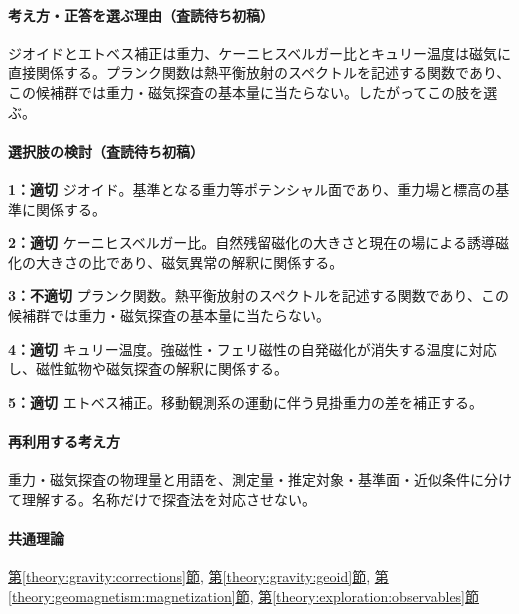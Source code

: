 \paragraph{考え方・正答を選ぶ理由（査読待ち初稿）} ジオイドとエトベス補正は重力、ケーニヒスベルガー比とキュリー温度は磁気に直接関係する。プランク関数は熱平衡放射のスペクトルを記述する関数であり、この候補群では重力・磁気探査の基本量に当たらない。したがってこの肢を選ぶ。

\paragraph{選択肢の検討（査読待ち初稿）}\mbox{}\par

\noindent\textbf{1：適切} ジオイド。基準となる重力等ポテンシャル面であり、重力場と標高の基準に関係する。\par

\noindent\textbf{2：適切} ケーニヒスベルガー比。自然残留磁化の大きさと現在の場による誘導磁化の大きさの比であり、磁気異常の解釈に関係する。\par

\noindent\textbf{3：不適切} プランク関数。熱平衡放射のスペクトルを記述する関数であり、この候補群では重力・磁気探査の基本量に当たらない。\par

\noindent\textbf{4：適切} キュリー温度。強磁性・フェリ磁性の自発磁化が消失する温度に対応し、磁性鉱物や磁気探査の解釈に関係する。\par

\noindent\textbf{5：適切} エトベス補正。移動観測系の運動に伴う見掛重力の差を補正する。\par

\paragraph{再利用する考え方} 重力・磁気探査の物理量と用語を、測定量・推定対象・基準面・近似条件に分けて理解する。名称だけで探査法を対応させない。

\paragraph{共通理論} \hyperref[theory:gravity:corrections]{第\ref*{theory:gravity:corrections}節}, \hyperref[theory:gravity:geoid]{第\ref*{theory:gravity:geoid}節}, \hyperref[theory:geomagnetism:magnetization]{第\ref*{theory:geomagnetism:magnetization}節}, \hyperref[theory:exploration:observables]{第\ref*{theory:exploration:observables}節}

